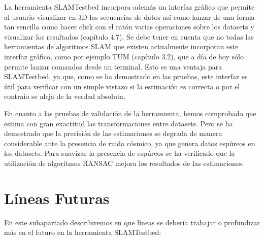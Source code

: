 La herramienta SLAMTestbed incorpora además un interfaz gráfico que permite al usuario visualizar en 3D las secuencias de datos así como lanzar de una forma tan sencilla como hacer click con el ratón varias operaciones sobre los datasets y visualizar los resultados (capítulo 4.7). Se debe tener en cuenta que no todas las herramientas de algoritmos SLAM que existen actualmente incorporan este interfaz gráfico, como por ejemplo TUM (capítulo 3.2), que a día de hoy sólo permite lanzar comandos desde un terminal. Esto es una ventaja para SLAMTestbed, ya que, como se ha demostrado en las pruebas, este interfaz es útil para verificar con un simple vistazo si la estimación es correcta o por el contraio se aleja de la verdad absoluta.

En cuanto a las pruebas de validación de la herramienta, hemos comprobado que estima con gran exactitud las transformaciones entre datasets. Pero se ha demostrado que la precisión de las estimaciones se degrada de manera considerable ante la presencia de ruido cósmico, ya que genera datos espúreos en los datasets. Para suavizar la presencia de espúreos se ha verificado que la utilización de algoritmos RANSAC mejora los resultados de las estimaciones.


\section{Líneas Futuras}

En este subapartado describiremos en que líneas se debería trabajar o profundizar más en el futuro en la herramienta SLAMTestbed:

